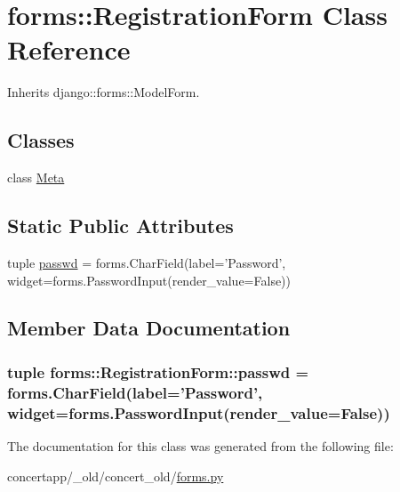 \hypertarget{classforms_1_1_registration_form}{
\section{forms::RegistrationForm Class Reference}
\label{classforms_1_1_registration_form}
}


Inherits django::forms::ModelForm.

\subsection*{Classes}
\begin{DoxyCompactItemize}
\item 
class \hyperlink{classforms_1_1_registration_form_1_1_meta}{Meta}
\end{DoxyCompactItemize}
\subsection*{Static Public Attributes}
\begin{DoxyCompactItemize}
\item 
tuple \hyperlink{classforms_1_1_registration_form_a8bc474e6d44591ec55234a172be4d575}{passwd} = forms.CharField(label='Password', widget=forms.PasswordInput(render\_\-value=False))
\end{DoxyCompactItemize}


\subsection{Member Data Documentation}
\hypertarget{classforms_1_1_registration_form_a8bc474e6d44591ec55234a172be4d575}{
\subsubsection[{passwd}]{\setlength{\rightskip}{0pt plus 5cm}tuple {\bf forms::RegistrationForm::passwd} = forms.CharField(label='Password', widget=forms.PasswordInput(render\_\-value=False))}}
\label{classforms_1_1_registration_form_a8bc474e6d44591ec55234a172be4d575}


The documentation for this class was generated from the following file:\begin{DoxyCompactItemize}
\item 
concertapp/\_\-old/concert\_\-old/\hyperlink{__old_2concert__old_2forms_8py}{forms.py}\end{DoxyCompactItemize}
